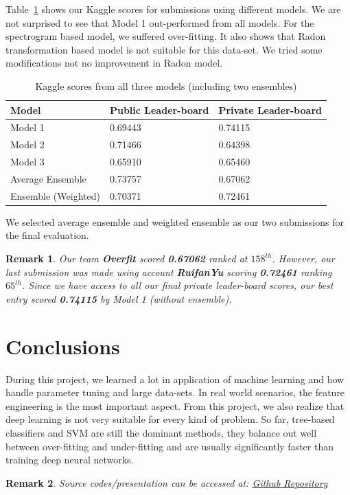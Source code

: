 \documentclass[letterpaper,12pt]{article}
\newtheorem*{remark}{Remark}
\begin{document}
Table~\ref{tab:results} shows our Kaggle scores for submissions using different models. We are
not surprised to see that Model 1 out-performed from all models. For
the spectrogram based model, we suffered over-fitting. It also shows that
Radon transformation based model is not suitable for this data-set. We tried
some modifications not no improvement in Radon model.

\begin{table}[h]
  \centering
  \begin{tabular}{@{}lll@{}}
    \toprule
    \textbf{Model}                 & \textbf{Public Leader-board} & \textbf{Private Leader-board} \\ \midrule
    \multicolumn{1}{|l|}{Model 1}  & \multicolumn{1}{l|}{0.69443} & \multicolumn{1}{l|}{0.74115}  \\ \midrule
    \multicolumn{1}{|l|}{Model 2}  & \multicolumn{1}{l|}{0.71466} & \multicolumn{1}{l|}{0.64398}  \\ \midrule
    \multicolumn{1}{|l|}{Model 3}  & \multicolumn{1}{l|}{0.65910} & \multicolumn{1}{l|}{0.65460}  \\ \midrule
    \multicolumn{1}{|l|}{Average Ensemble} & \multicolumn{1}{l|}{0.73757} & \multicolumn{1}{l|}{0.67062}  \\ \midrule
    \multicolumn{1}{|l|}{Ensemble (Weighted)}            & \multicolumn{1}{l|}{0.70371}                      & \multicolumn{1}{l|}{0.72461}                       \\ \bottomrule
  \end{tabular}
  \caption{Kaggle scores from all three models (including two ensembles) \label{tab:results}}
\end{table}

We selected average ensemble and weighted ensemble as our two submissions for
the final evaluation.

\begin{remark} Our team \textbf{Overfit} scored \textbf{0.67062} ranked at
$158^{th}$. However, our last submission was made using account
\textbf{RuifanYu} scoring \textbf{0.72461} ranking $65^{th}$. Since we have
access to all our final private leader-board scores, our best entry scored
\textbf{0.74115} by Model 1 (without ensemble).
\end{remark}

  
\section{Conclusions}
During this project, we learned a lot in application of machine learning and how
handle parameter tuning and large data-sets. In real world scenarios, the
feature engineering is the most important aspect. From this project, we also
realize that deep learning is not very suitable for every kind of problem. So
far, tree-based classifiers and SVM are still the dominant methods, they balance
out well between over-fitting and under-fitting and are usually significantly
faster than training deep neural networks.

\begin{remark} Source codes/presentation can be accessed at:
  \href{https://github.com/shivamkalra/stats-841-project}{Github Repository}
\end{remark}



\end{document}
